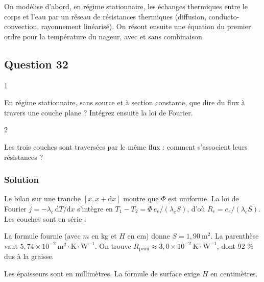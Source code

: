 \documentclass[11pt,a4paper]{article}
\newcommand{\equationajustee}[1]{%
  \sbox{\boiteequation}{$\displaystyle #1$}%
  \ifdim\wd\boiteequation>\linewidth
    \[\resizebox{\linewidth}{!}{\usebox{\boiteequation}}\]%
  \else
    \[#1\]%
  \fi}
\begin{document}
On modélise d'abord, en régime stationnaire, les échanges thermiques entre le corps et l'eau par un réseau de résistances thermiques (diffusion, conducto-convection, rayonnement linéarisé). On résout ensuite une équation du premier ordre pour la température du nageur, avec et sans combinaison.

\hypertarget{question-32}{%
\subsection{Question 32}\label{question-32}}

\begin{indication}{1}

En régime stationnaire, sans source et à section constante, que dire du flux à travers une couche plane ? Intégrez ensuite la loi de Fourier.

\end{indication}

\begin{indication}{2}

Les trois couches sont traversées par le même flux : comment s'associent leurs résistances ?

\end{indication}

\hypertarget{solution-31}{%
\subsubsection{Solution}\label{solution-31}}

Le bilan sur une tranche \([x, x + \mathrm dx]\) montre que \(\Phi\) est uniforme. La loi de Fourier \(j = -\lambda_e\,\mathrm dT/\mathrm dx\) s'intègre en \(T_1 - T_2 = \Phi\,e_e/(\lambda_e S)\), d'où \(\boxed{R_e = e_e/(\lambda_e S)}\). Les couches sont en série :

\equationajustee{\boxed{R_{\text{peau}} = \frac{1}{S}\left(\frac{e_e}{\lambda_e} + \frac{e_d}{\lambda_d} + \frac{e_g}{\lambda_g}\right)}}

La formule fournie (avec \(m\) en kg et \(H\) en cm) donne \(S = 1{,}90\ \mathrm{m^2}\). La parenthèse vaut \(5{,}74\times 10^{-2}\ \mathrm{m^2\cdot K\cdot W^{-1}}\). On trouve \(\boxed{R_{\text{peau}} \approx 3{,}0\times 10^{-2}\ \mathrm{K\cdot W^{-1}}}\), dont 92 \% dus à la graisse.

\begin{piege}

Les épaisseurs sont en millimètres. La formule de surface exige \(H\) en centimètres.

\end{piege}
\end{document}
